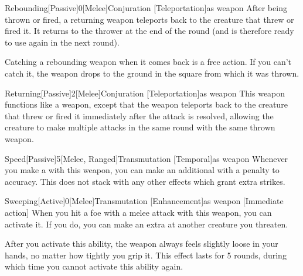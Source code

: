         \begin{magicitemdef}{Rebounding}[Passive]{0}[Melee]{Conjuration [Teleportation]}{as weapon}
             After being thrown or fired, a returning weapon teleports back to the creature that threw or fired it.
            It returns to the thrower at the end of the round (and is therefore ready to use again in the next round).

            Catching a rebounding weapon when it comes back is a free action.
            If you can't catch it, the weapon drops to the ground in the square from which it was thrown.
        \end{magicitemdef}

        \begin{magicitemdef}{Returning}[Passive]{2}[Melee]{Conjuration [Teleportation]}{as weapon}
             This weapon functions like a  weapon, except that the weapon teleports back to the creature that threw or fired it immediately after the attack is resolved, allowing the creature to make multiple attacks in the same round with the same thrown weapon.
        \end{magicitemdef}

        \begin{magicitemdef}{Speed}[Passive]{5}[Melee, Ranged]{Transmutation [Temporal]}{as weapon}
             Whenever you make a  with this weapon, you can make an additional  with a  penalty to accuracy.
            This does not stack with any other effects which grant extra strikes.
        \end{magicitemdef}

        \begin{magicitemdef}{Sweeping}[Active]{0}[Melee]{Transmutation [Enhancement]}{as weapon}
            [Immediate action] When you hit a foe with a melee attack with this weapon, you can activate it.
            If you do, you can make an extra  at another creature you threaten.

            After you activate this ability, the weapon always feels slightly loose in your hands, no matter how tightly you grip it.
            This effect lasts for 5 rounds, during which time you cannot activate this ability again.
        \end{magicitemdef}

